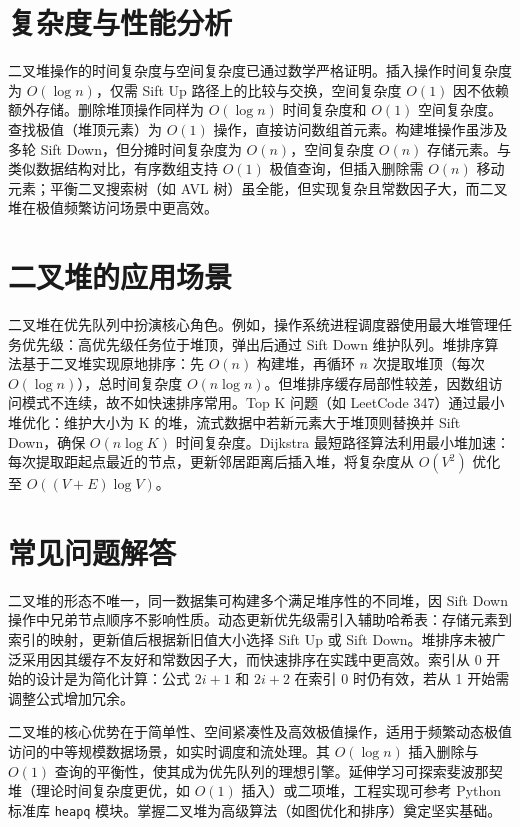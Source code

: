 \chapter{复杂度与性能分析}
二叉堆操作的时间复杂度与空间复杂度已通过数学严格证明。插入操作时间复杂度为 $O(\log n)$，仅需 Sift Up 路径上的比较与交换，空间复杂度 $O(1)$ 因不依赖额外存储。删除堆顶操作同样为 $O(\log n)$ 时间复杂度和 $O(1)$ 空间复杂度。查找极值（堆顶元素）为 $O(1)$ 操作，直接访问数组首元素。构建堆操作虽涉及多轮 Sift Down，但分摊时间复杂度为 $O(n)$，空间复杂度 $O(n)$ 存储元素。与类似数据结构对比，有序数组支持 $O(1)$ 极值查询，但插入删除需 $O(n)$ 移动元素；平衡二叉搜索树（如 AVL 树）虽全能，但实现复杂且常数因子大，而二叉堆在极值频繁访问场景中更高效。\par
\chapter{二叉堆的应用场景}
二叉堆在优先队列中扮演核心角色。例如，操作系统进程调度器使用最大堆管理任务优先级：高优先级任务位于堆顶，弹出后通过 Sift Down 维护队列。堆排序算法基于二叉堆实现原地排序：先 $O(n)$ 构建堆，再循环 $n$ 次提取堆顶（每次 $O(\log n)$），总时间复杂度 $O(n \log n)$。但堆排序缓存局部性较差，因数组访问模式不连续，故不如快速排序常用。Top K 问题（如 LeetCode 347）通过最小堆优化：维护大小为 K 的堆，流式数据中若新元素大于堆顶则替换并 Sift Down，确保 $O(n \log K)$ 时间复杂度。Dijkstra 最短路径算法利用最小堆加速：每次提取距起点最近的节点，更新邻居距离后插入堆，将复杂度从 $O(V^2)$ 优化至 $O((V+E) \log V)$。\par
\chapter{常见问题解答}
二叉堆的形态不唯一，同一数据集可构建多个满足堆序性的不同堆，因 Sift Down 操作中兄弟节点顺序不影响性质。动态更新优先级需引入辅助哈希表：存储元素到索引的映射，更新值后根据新旧值大小选择 Sift Up 或 Sift Down。堆排序未被广泛采用因其缓存不友好和常数因子大，而快速排序在实践中更高效。索引从 0 开始的设计是为简化计算：公式 $2i+1$ 和 $2i+2$ 在索引 0 时仍有效，若从 1 开始需调整公式增加冗余。\par
二叉堆的核心优势在于简单性、空间紧凑性及高效极值操作，适用于频繁动态极值访问的中等规模数据场景，如实时调度和流处理。其 $O(\log n)$ 插入删除与 $O(1)$ 查询的平衡性，使其成为优先队列的理想引擎。延伸学习可探索斐波那契堆（理论时间复杂度更优，如 $O(1)$ 插入）或二项堆，工程实现可参考 Python 标准库 \texttt{heapq} 模块。掌握二叉堆为高级算法（如图优化和排序）奠定坚实基础。\par

